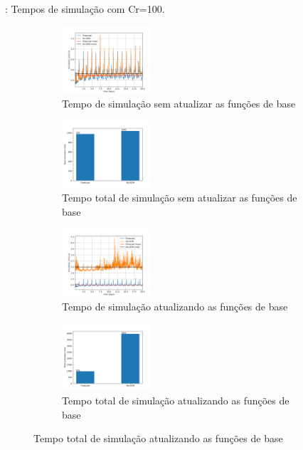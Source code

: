 \documentclass[professionalfont]{beamer}
\begin{document}
\begin{frame}{\FrameProblemName: {\small Tempos de simulação com Cr=100.}}
    \begin{figure}[!h]
        \centering
        \begin{subfigure}{.48\textwidth}
            \centering
            \includegraphics[height=2.5cm]{./imgs/pr3/cr100/no_update/svgtopng/tempo_de_simulacao.png}
            \caption{Tempo de simulação sem atualizar as funções de base}
        \end{subfigure}
        \hfill
        \begin{subfigure}{.48\textwidth}
            \centering
            \includegraphics[height=2.5cm]{./imgs/pr3/cr100/no_update/svgtopng/tempo_total.png}
            \caption{Tempo total de simulação sem atualizar as funções de base}
        \end{subfigure}
        \bigskip
        \begin{subfigure}[t]{.48\textwidth}
            \centering
            \includegraphics[height=2.5cm]{./imgs/pr3/cr16/Update/tempo_simulacao.png}
            \caption{Tempo de simulação atualizando as funções de base}
        \end{subfigure}
        \hfill
        \begin{subfigure}[t]{.48\textwidth}
            \centering
            \includegraphics[height=2.5cm]{./imgs/pr3/cr16/Update/tempo_total.png}
            \caption{Tempo total de simulação atualizando as funções de base}
        \end{subfigure}
    
        \label{fig:fig9_pr3-cr100}
    \end{figure}
\end{frame}
\end{document}
